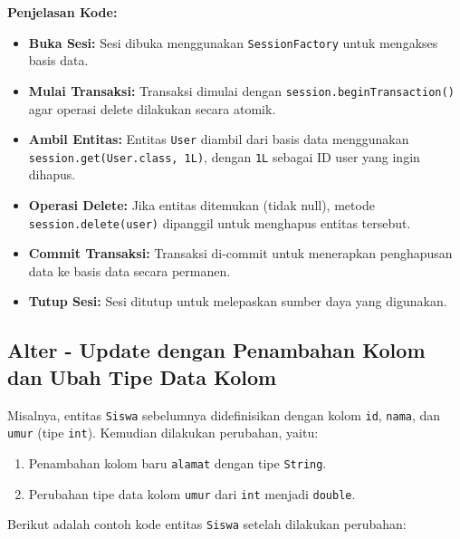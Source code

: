\textbf{Penjelasan Kode:}
\begin{itemize}
	\item \textbf{Buka Sesi:} Sesi dibuka menggunakan \texttt{SessionFactory} untuk mengakses basis data.
	\item \textbf{Mulai Transaksi:} Transaksi dimulai dengan \texttt{session.beginTransaction()} agar operasi delete dilakukan secara atomik.
	\item \textbf{Ambil Entitas:} Entitas \texttt{User} diambil dari basis data menggunakan \texttt{session.get(User.class, 1L)}, dengan \texttt{1L} sebagai ID user yang ingin dihapus.
	\item \textbf{Operasi Delete:} Jika entitas ditemukan (tidak null), metode \texttt{session.delete(user)} dipanggil untuk menghapus entitas tersebut.
	\item \textbf{Commit Transaksi:} Transaksi di-commit untuk menerapkan penghapusan data ke basis data secara permanen.
	\item \textbf{Tutup Sesi:} Sesi ditutup untuk melepaskan sumber daya yang digunakan.
\end{itemize}

\subsection{Alter - Update dengan Penambahan Kolom dan Ubah Tipe Data Kolom}

Misalnya, entitas \texttt{Siswa} sebelumnya didefinisikan dengan kolom \texttt{id}, \texttt{nama}, dan \texttt{umur} (tipe \texttt{int}). Kemudian dilakukan perubahan, yaitu:
\begin{enumerate}
	\item Penambahan kolom baru \texttt{alamat} dengan tipe \texttt{String}.
	\item Perubahan tipe data kolom \texttt{umur} dari \texttt{int} menjadi \texttt{double}.
\end{enumerate}

Berikut adalah contoh kode entitas \texttt{Siswa} setelah dilakukan perubahan:

